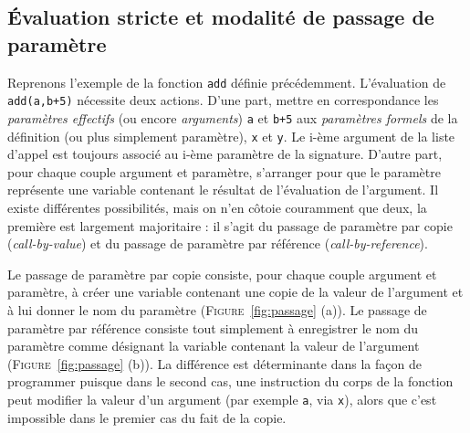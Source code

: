 \documentclass[a4paper,francais]{insalyon}
\begin{document}
\subsection{\'Evaluation stricte et modalité de passage de paramètre}

Reprenons l'exemple de la fonction \texttt{add} définie précédemment. L'évaluation de \verb!add(a,b+5)! nécessite deux actions. D'une part, mettre en correspondance les \emph{paramètres effectifs} (ou encore \emph{arguments}) \texttt{a} et \texttt{b+5} aux \emph{paramètres formels} de la définition (ou plus simplement paramètre), \texttt{x} et \texttt{y}. Le i-ème argument de la liste d'appel est toujours associé au i-ème paramètre de la signature. D'autre part, pour chaque couple argument et paramètre, s'arranger pour que le paramètre représente une variable contenant le résultat de l'évaluation de l'argument. Il existe différentes possibilités, mais on n'en côtoie couramment que deux, la première est largement majoritaire : il s'agit du passage de paramètre par copie (\emph{call-by-value}) et du passage de paramètre par référence (\emph{call-by-reference}).

Le passage de paramètre par copie consiste, pour chaque couple argument et paramètre, à créer une variable contenant une copie de la valeur de l'argument et à lui donner le nom du paramètre (\textsc{Figure}~\ref{fig:passage} (a)). Le passage de paramètre par référence consiste tout simplement à enregistrer le nom du paramètre comme désignant la variable contenant la valeur de l'argument (\textsc{Figure}~\ref{fig:passage} (b)). La différence est déterminante dans la façon de programmer puisque dans le second cas, une instruction du corps de la fonction peut modifier la valeur d'un argument (par exemple \texttt{a}, via \texttt{x}), alors que c'est impossible dans le premier cas du fait de la copie. 
\end{document}
